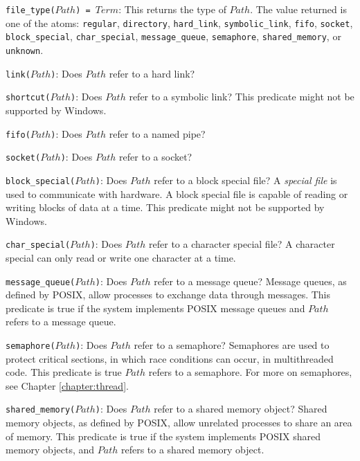 \begin{itemize}
{\item \texttt{file\_type($Path$) = $Term$}: This returns the type of $Path$.  The value returned is one of the atoms: \texttt{regular}, \texttt{directory}, \texttt{hard\_link}, \texttt{symbolic\_link}, \texttt{fifo}, \texttt{socket}, \texttt{block\_special}, \texttt{char\_special}, \texttt{message\_queue}, \texttt{semaphore}, \texttt{shared\_memory}, or \texttt{unknown}.
\item \texttt{link($Path$)}: Does $Path$ refer to a hard link?  
\item \texttt{shortcut($Path$)}: Does $Path$ refer to a symbolic link?  This predicate might not be supported by Windows.
\item \texttt{fifo($Path$)}: Does $Path$ refer to a named pipe?
\item \texttt{socket($Path$)}: Does $Path$ refer to a socket?
\item \texttt{block\_special($Path$)}: Does $Path$ refer to a block special file?  A \emph{special file} is used to communicate with hardware.  A block special file is capable of reading or writing blocks of data at a time.  This predicate might not be supported by Windows.
\item \texttt{char\_special($Path$)}: Does $Path$ refer to a character special file?  A character special can only read or write one character at a time.
\item \texttt{message\_queue($Path$)}: Does $Path$ refer to a message queue?  Message queues, as defined by POSIX, allow processes to exchange data through messages.  This predicate is true if the system implements POSIX message queues and $Path$ refers to a message queue.
\item \texttt{semaphore($Path$)}: Does $Path$ refer to a semaphore?  Semaphores are used to protect critical sections, in which race conditions can occur, in multithreaded code.  This predicate is true $Path$ refers to a semaphore.  For more on semaphores, see Chapter \ref{chapter:thread}.
\item \texttt{shared\_memory($Path$)}: Does $Path$ refer to a shared memory object?  Shared memory objects, as defined by POSIX, allow unrelated processes to share an area of memory.  This predicate is true if the system implements POSIX shared memory objects, and $Path$ refers to a shared memory object.
}
\end{itemize}
